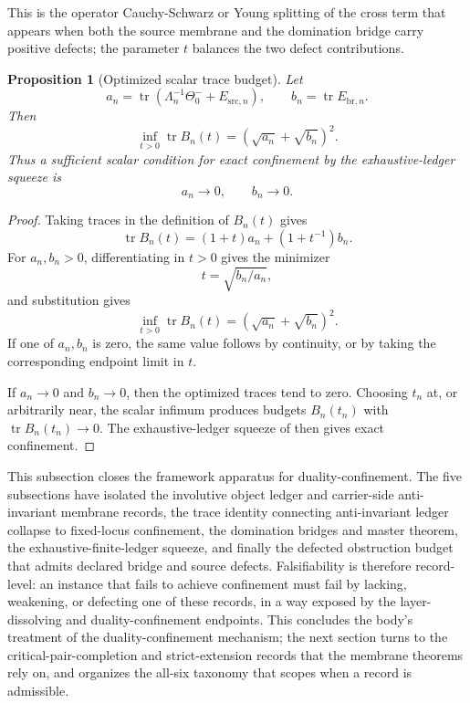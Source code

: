 \documentclass[11pt]{article}
\DeclareMathOperator{\tr}{tr}
\newtheorem{proposition}[theorem]{Proposition}
\theoremstyle{definition}
\begin{document}
This is the operator Cauchy-Schwarz or Young splitting of the cross
term \citep{BhatiaDavis1995CauchySchwarz,Ando1995MatrixYoung} that
appears when both the source membrane and the domination bridge carry
positive defects; the parameter \(t\) balances the two defect
contributions.

\begin{proposition}[Optimized scalar trace budget]\label{prop:main:optimized-trace-budget}
Let
\[
  a_n=\tr(\Lambda_n^{-1}\Theta_0^-+E_{\mathrm{src},n}),
  \qquad
  b_n=\tr E_{\mathrm{br},n}.
\]
Then
\[
  \inf_{t>0}\tr B_n(t)=(\sqrt{a_n}+\sqrt{b_n})^2.
\]
Thus a sufficient scalar condition for exact confinement by the
exhaustive-ledger squeeze is
\[
  a_n\to 0,\qquad b_n\to 0.
\]
\end{proposition}

\begin{proof}
Taking traces in the definition of \(B_n(t)\) gives
\[
  \tr B_n(t)=(1+t)a_n+(1+t^{-1})b_n.
\]
For \(a_n,b_n>0\), differentiating in \(t>0\) gives the minimizer
\[
  t=\sqrt{b_n/a_n},
\]
and substitution gives
\[
  \inf_{t>0}\tr B_n(t)=(\sqrt{a_n}+\sqrt{b_n})^2.
\]
If one of \(a_n,b_n\) is zero, the same value follows by continuity, or
by taking the corresponding endpoint limit in \(t\).

If \(a_n\to0\) and \(b_n\to0\), then the optimized traces tend to zero.
Choosing \(t_n\) at, or arbitrarily near, the scalar infimum produces
budgets \(B_n(t_n)\) with \(\tr B_n(t_n)\to0\).  The
exhaustive-ledger squeeze of
 then gives exact
confinement.
\end{proof}

This subsection closes the framework apparatus for
duality-confinement.  The five subsections have isolated the involutive
object ledger and carrier-side anti-invariant membrane records, the
trace identity connecting anti-invariant ledger collapse to fixed-locus
confinement, the domination bridges and master theorem, the
exhaustive-finite-ledger squeeze, and finally the defected obstruction
budget that admits declared bridge and source defects.  Falsifiability
is therefore record-level: an instance that fails to achieve confinement
must fail by lacking, weakening, or defecting one of these records, in a
way exposed by the layer-dissolving and duality-confinement endpoints.
This concludes the body's treatment of the duality-confinement
mechanism; the next section turns to the critical-pair-completion and
strict-extension records that the membrane theorems rely on, and
 organizes the all-six taxonomy that scopes when a
record is admissible.
\end{document}
